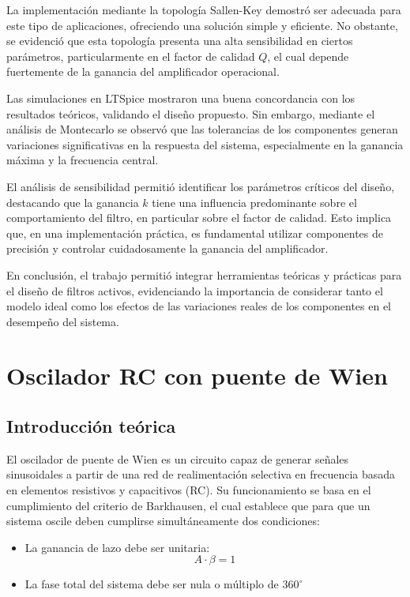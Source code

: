 \documentclass[12pt,a4paper]{article}
\begin{document}
La implementación mediante la topología Sallen-Key demostró ser adecuada para este tipo de aplicaciones, ofreciendo una solución simple y eficiente. No obstante, se evidenció que esta topología presenta una alta sensibilidad en ciertos parámetros, particularmente en el factor de calidad \(Q\), el cual depende fuertemente de la ganancia del amplificador operacional.

Las simulaciones en LTSpice mostraron una buena concordancia con los resultados teóricos, validando el diseño propuesto. Sin embargo, mediante el análisis de Montecarlo se observó que las tolerancias de los componentes generan variaciones significativas en la respuesta del sistema, especialmente en la ganancia máxima y la frecuencia central.

El análisis de sensibilidad permitió identificar los parámetros críticos del diseño, destacando que la ganancia \(k\) tiene una influencia predominante sobre el comportamiento del filtro, en particular sobre el factor de calidad. Esto implica que, en una implementación práctica, es fundamental utilizar componentes de precisión y controlar cuidadosamente la ganancia del amplificador.

En conclusión, el trabajo permitió integrar herramientas teóricas y prácticas para el diseño de filtros activos, evidenciando la importancia de considerar tanto el modelo ideal como los efectos de las variaciones reales de los componentes en el desempeño del sistema.

\newpage

\appendix
\section{Oscilador RC con puente de Wien}

\subsection{Introducción teórica}

El oscilador de puente de Wien es un circuito capaz de generar señales sinusoidales a partir de una red de realimentación selectiva en frecuencia basada en elementos resistivos y capacitivos (RC). Su funcionamiento se basa en el cumplimiento del criterio de Barkhausen, el cual establece que para que un sistema oscile deben cumplirse simultáneamente dos condiciones:

\begin{itemize}
    \item La ganancia de lazo debe ser unitaria:
    \[
    A \cdot \beta = 1
    \]
    \item La fase total del sistema debe ser nula o múltiplo de \(360^\circ\)
\end{itemize}
\end{document}
